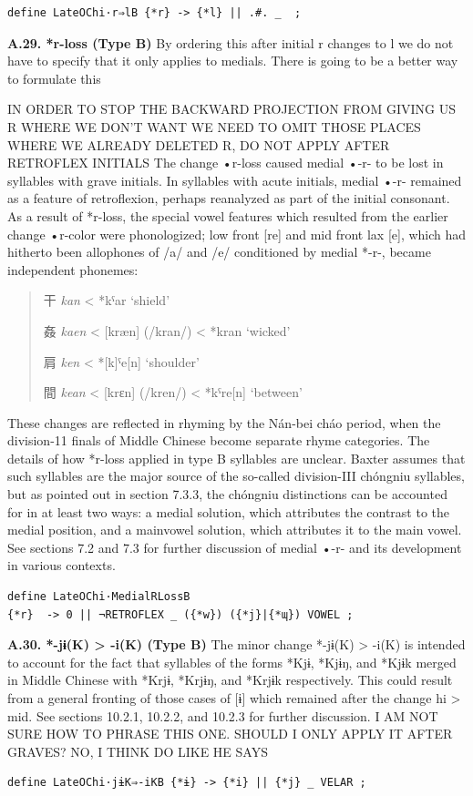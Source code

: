 \documentclass[xetex, svgnames, 12pt]{scrartcl}
\newcounter{para}
\newcommand\mypara[1]{\par\refstepcounter{para}\textbf{\thepara\space#1\space}}
\begin{document}
\begin{verbatim}
define LateOChi·r⇒lB {*r} -> {*l} || .#. _  ;    
\end{verbatim}


\mypara{A.29. *r-loss (Type B)}
 By ordering this after initial r changes to l we do not have to specify that it only applies to medials. 
 There is going to be a better way to formulate this 

 IN ORDER TO STOP THE BACKWARD PROJECTION FROM GIVING US R WHERE WE DON'T WANT
 WE NEED TO OMIT THOSE PLACES WHERE WE ALREADY DELETED R,
 DO NOT APPLY AFTER RETROFLEX INITIALS 
 The change •r-loss caused medial •-r- to be lost in syllables with grave initials. In
 syllables with acute initials, medial •-r- remained as a feature of retroflexion, perhaps
 reanalyzed as part of the initial consonant. As a result of *r-loss, the special vowel features
 which resulted from the earlier change •r-color were phonologized; low front [re] and mid
 front lax [e], which had hitherto been allophones of /a/ and /e/ conditioned by medial *-r-,
 became independent phonemes:
 \begin{quote}
 干 %
 \textit{kan} < *kˤar `shield'

 姦 %
 \textit{kaen} < [kræn] (/kran/) < *kran `wicked'

 肩 %
 \textit{ken} < *[k]ˤe[n] `shoulder'

 間 %
 \textit{kean} < [krɛn] (/kren/) < *kˤre[n] `between'
 \end{quote}
 These changes are reflected in rhyming by the Nán-bei cháo period, when the division-11
 finals of Middle Chinese become separate rhyme categories.
 The details of how *r-loss applied in type B syllables are unclear. Baxter assumes that
 such syllables are the major source of the so-called division-III chóngniu syllables, but as
 pointed out in section 7.3.3, the chóngniu distinctions can be accounted for in at least two
 ways: a medial solution, which attributes the contrast to the medial position, and a mainvowel
 solution, which attributes it to the main vowel. See sections 7.2 and 7.3 for further
 discussion of medial •-r- and its development in various contexts.
 
 \begin{verbatim}
define LateOChi·MedialRLossB 
{*r}  -> 0 || ¬RETROFLEX _ ({*w}) ({*j}|{*ɰ}) VOWEL ;
\end{verbatim}


\mypara{A.30. *-jɨ(K) > -i(K) (Type B)}
The minor change *-jɨ(K) > -i(K) is intended to account for the fact that syllables of the
 forms *Kjɨ, *Kjɨŋ, and *Kjɨk merged in Middle Chinese with *Krjɨ, *Krjɨŋ, and *Krjɨk
 respectively. This could result from a general fronting of those cases of [ɨ] which remained
 after the change hi > mid. See sections 10.2.1, 10.2.2, and 10.2.3 for further discussion.
 I AM NOT SURE HOW TO PHRASE THIS ONE. SHOULD I ONLY APPLY IT AFTER GRAVES? NO, I THINK DO LIKE HE SAYS
 \begin{verbatim}
define LateOChi·jɨK⇒-iKB {*ɨ} -> {*i} || {*j} _ VELAR ;
 \end{verbatim}
\end{document}
